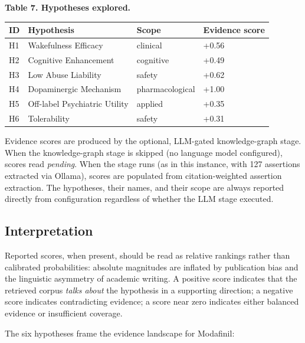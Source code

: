 \documentclass[
  english,
]{article}
\newcounter{none} %
\begin{document}
\textbf{Table 7. Hypotheses explored.}

{\def\LTcaptype{none} %
\begin{longtable}[]{@{}llll@{}}
\toprule\noalign{}
ID & Hypothesis & Scope & Evidence score \\
\midrule\noalign{}
\endhead
\bottomrule\noalign{}
\endlastfoot
H1 & Wakefulness Efficacy & clinical & +0.56 \\
H2 & Cognitive Enhancement & cognitive & +0.49 \\
H3 & Low Abuse Liability & safety & +0.62 \\
H4 & Dopaminergic Mechanism & pharmacological & +1.00 \\
H5 & Off-label Psychiatric Utility & applied & +0.35 \\
H6 & Tolerability & safety & +0.31 \\
\end{longtable}
}

Evidence scores are produced by the optional, LLM-gated knowledge-graph
stage. When the knowledge-graph stage is skipped (no language model
configured), scores read \emph{pending}. When the stage runs (as in this
instance, with 127 assertions extracted via Ollama), scores are
populated from citation-weighted assertion extraction. The hypotheses,
their names, and their scope are always reported directly from
configuration regardless of whether the LLM stage executed.

\subsection{Interpretation}\label{interpretation}

Reported scores, when present, should be read as relative rankings
rather than calibrated probabilities: absolute magnitudes are inflated
by publication bias and the linguistic asymmetry of academic writing. A
positive score indicates that the retrieved corpus \emph{talks about}
the hypothesis in a supporting direction; a negative score indicates
contradicting evidence; a score near zero indicates either balanced
evidence or insufficient coverage.

The six hypotheses frame the evidence landscape for Modafinil:
\end{document}

